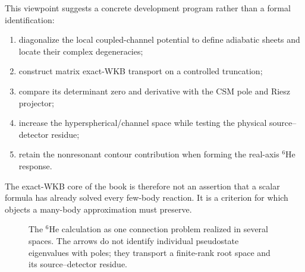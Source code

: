 This viewpoint suggests a concrete development program rather than a formal
identification:
\begin{enumerate}[label=\arabic*.]
  \item diagonalize the local coupled-channel potential to define adiabatic
  sheets and locate their complex degeneracies;
  \item construct matrix exact-WKB transport on a controlled truncation;
  \item compare its determinant zero and derivative with the CSM pole and
  Riesz projector;
  \item increase the hyperspherical/channel space while testing the physical
  source--detector residue;
  \item retain the nonresonant contour contribution when forming the real-axis
  $^6$He response.
\end{enumerate}
The exact-WKB core of the book is therefore not an assertion that a scalar
formula has already solved every few-body reaction.  It is a criterion for
which objects a many-body approximation must preserve.

\begin{figure}[t]
  \centering
  \caption{The $^6$He calculation as one connection problem realized in
  several spaces.  The arrows do not identify individual pseudostate
  eigenvalues with poles; they transport a finite-rank root space and its
  source--detector residue.}
  \label{fig:he6-pole-to-observable}
\end{figure}

